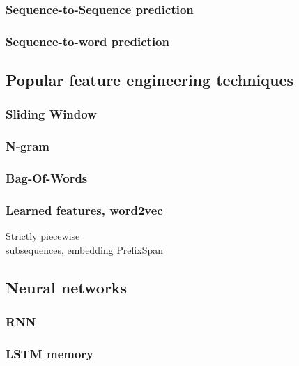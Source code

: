 \subsubsection{Sequence-to-Sequence prediction}
\subsubsection{Sequence-to-word prediction}

\subsection{Popular feature engineering techniques}
\subsubsection{Sliding Window}
\subsubsection{N-gram}
\subsubsection{Bag-Of-Words}
\subsubsection{Learned features, word2vec}
Strictly piecewise\\
subsequences, embedding
PrefixSpan

\subsection{Neural networks}
\subsubsection{RNN}
\subsubsection{LSTM memory}